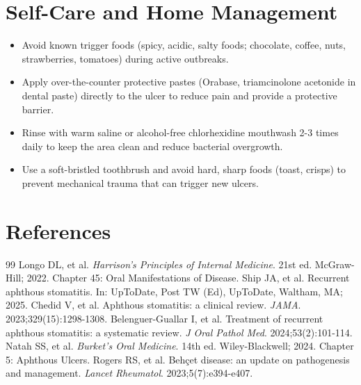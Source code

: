 \section*{Self-Care and Home Management}
\begin{itemize}
  \item Avoid known trigger foods (spicy, acidic, salty foods; chocolate, coffee, nuts, strawberries, tomatoes) during active outbreaks.
  \item Apply over-the-counter protective pastes (Orabase, triamcinolone acetonide in dental paste) directly to the ulcer to reduce pain and provide a protective barrier.
  \item Rinse with warm saline or alcohol-free chlorhexidine mouthwash 2-3 times daily to keep the area clean and reduce bacterial overgrowth.
  \item Use a soft-bristled toothbrush and avoid hard, sharp foods (toast, crisps) to prevent mechanical trauma that can trigger new ulcers.
\end{itemize}

\section*{References}

\begin{thebibliography}{99}
 Longo DL, et al. \emph{Harrison's Principles of Internal Medicine}. 21st ed. McGraw-Hill; 2022. Chapter 45: Oral Manifestations of Disease.
 Ship JA, et al. Recurrent aphthous stomatitis. In: UpToDate, Post TW (Ed), UpToDate, Waltham, MA; 2025.
 Chedid V, et al. Aphthous stomatitis: a clinical review. \emph{JAMA}. 2023;329(15):1298-1308.
 Belenguer-Guallar I, et al. Treatment of recurrent aphthous stomatitis: a systematic review. \emph{J Oral Pathol Med}. 2024;53(2):101-114.
 Natah SS, et al. \emph{Burket's Oral Medicine}. 14th ed. Wiley-Blackwell; 2024. Chapter 5: Aphthous Ulcers.
 Rogers RS, et al. Beh\c{c}et disease: an update on pathogenesis and management. \emph{Lancet Rheumatol}. 2023;5(7):e394-e407.
\end{thebibliography}
